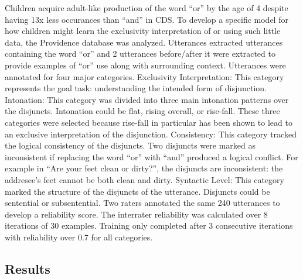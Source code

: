 \documentclass[10pt, letterpaper]{article}
\begin{document}
Children acquire adult-like production of the word ``or'' by the age of
4 despite having 13x less occurances than ``and'' in CDS. To develop a
specific model for how children might learn the exclusivity
interpretation of or using such little data, the Providence database was
analyzed. Utterances extracted utterances containing the word ``or'' and
2 utterances before/after it were extracted to provide examples of
``or'' use along with surrounding context. Utterances were annotated for
four major categories. Exclusivity Interpretation: This category
represents the goal task: understanding the intended form of
disjunction. Intonation: This category was divided into three main
intonation patterns over the disjuncts. Intonation could be flat, rising
overall, or rise-fall. These three categories were selected because
rise-fall in particular has been shown to lead to an exclusive
interpretation of the disjunction. Consistency: This category tracked
the logical consistency of the disjuncts. Two disjuncts were marked as
inconsistent if replacing the word ``or'' with ``and'' produced a
logical conflict. For example in ``Are your feet clean or dirty?'', the
disjuncts are inconsistent: the addresee's feet cannot be both clean and
dirty. Syntactic Level: This category marked the structure of the
disjuncts of the utterance. Disjuncts could be sentential or
subsentential. Two raters annotated the same 240 utterances to develop a
reliability score. The interrater reliability was calculated over 8
iterations of 30 examples. Training only completed after 3 consecutive
iterations with reliability over 0.7 for all categories.

\subsection{Results}\label{results-1}
\end{document}
